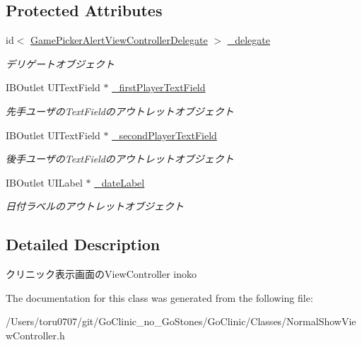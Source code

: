 \subsection*{Protected Attributes}
\begin{DoxyCompactItemize}
\item 
\hypertarget{interface_normal_show_view_controller_a9f09b73cf79c192e3575673bdc3a03ee}{
id$<$ \hyperlink{protocol_game_picker_alert_view_controller_delegate-p}{GamePickerAlertViewControllerDelegate} $>$ \hyperlink{interface_normal_show_view_controller_a9f09b73cf79c192e3575673bdc3a03ee}{\_\-delegate}}
\label{interface_normal_show_view_controller_a9f09b73cf79c192e3575673bdc3a03ee}

\begin{DoxyCompactList}\small\item\em デリゲートオブジェクト \end{DoxyCompactList}\item 
\hypertarget{interface_normal_show_view_controller_ae769e6b48507a7983894f2f5f3e00eb0}{
IBOutlet UITextField $\ast$ \hyperlink{interface_normal_show_view_controller_ae769e6b48507a7983894f2f5f3e00eb0}{\_\-firstPlayerTextField}}
\label{interface_normal_show_view_controller_ae769e6b48507a7983894f2f5f3e00eb0}

\begin{DoxyCompactList}\small\item\em 先手ユーザのTextFieldのアウトレットオブジェクト \end{DoxyCompactList}\item 
\hypertarget{interface_normal_show_view_controller_ad7220c0c188a0a95335e0d848b902ee0}{
IBOutlet UITextField $\ast$ \hyperlink{interface_normal_show_view_controller_ad7220c0c188a0a95335e0d848b902ee0}{\_\-secondPlayerTextField}}
\label{interface_normal_show_view_controller_ad7220c0c188a0a95335e0d848b902ee0}

\begin{DoxyCompactList}\small\item\em 後手ユーザのTextFieldのアウトレットオブジェクト \end{DoxyCompactList}\item 
\hypertarget{interface_normal_show_view_controller_a7246229a33a7ccc3e0ea5d80176411bb}{
IBOutlet UILabel $\ast$ \hyperlink{interface_normal_show_view_controller_a7246229a33a7ccc3e0ea5d80176411bb}{\_\-dateLabel}}
\label{interface_normal_show_view_controller_a7246229a33a7ccc3e0ea5d80176411bb}

\begin{DoxyCompactList}\small\item\em 日付ラベルのアウトレットオブジェクト \end{DoxyCompactList}\end{DoxyCompactItemize}


\subsection{Detailed Description}
クリニック表示画面のViewController  inoko 

The documentation for this class was generated from the following file:\begin{DoxyCompactItemize}
\item 
/Users/toru0707/git/GoClinic\_\-no\_\-GoStones/GoClinic/Classes/NormalShowViewController.h\end{DoxyCompactItemize}
